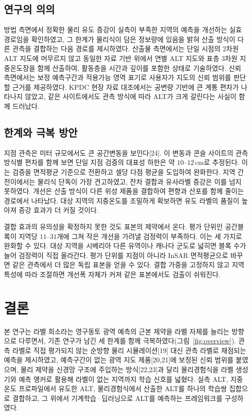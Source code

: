 \documentclass[10pt,twocolumn]{article}
\begin{document}
\subsection{연구의 의의}
방법 측면에서 정확한 물리 유도 증강이 실측이 부족한 지역의 예측을 개선하는 실효 경로임을 확인하였고, 그 한계가 물리식이 담은 정보량에 있음을 밝혀 산출 방식이 다른 관측을 결합하는 다음 경로를 제시하였다. 산출물 측면에서는 단일 시점의 2차원 ALT 지도에 머무르지 않고 동일한 자료 기반 위에서 연별 ALT 지도와 표층 3차원 지중온도장을 함께 산출하여, 활동층을 시간과 깊이를 포함한 상태로 기술하였다. 신뢰 측면에서는 보정 예측구간과 적용가능 영역 표기로 사용자가 지도의 신뢰 범위를 판단할 근거를 제공하였다. KPDC 현장 자료 대조에서는 공변량 기반에 큰 계통 편차가 나타나지 않았고, 같은 사이트에서도 관측 방식에 따라 ALT가 크게 갈린다는 사실이 함께 드러났다.

\subsection{한계와 극복 방안}
지점 관측은 미터 규모에서도 큰 공간변동을 보인다[24]. 이 변동과 콘슬 사이트의 관측 방식별 편차를 함께 보면 단일 지점 검증의 대표성 하한은 약 $10\text{--}12\,\mathrm{cm}$로 추정된다. 이는 검증을 면적평균 기준으로 전환하고 셀당 다점 평균을 도입하여 완화한다. 지역 간 전이에서는 물리식 단독이 가장 견고하였고, 잔차 결합과 유사라벨 증강은 이를 넘지 못하였다. 개선은 산출 방식이 다른 위성 제품을 결합하여 편향과 산포를 함께 줄이는 경로에서 나타났다. 대상 지역의 지중온도를 조밀하게 확보하면 유도 라벨의 품질이 높아져 증강 효과가 더 커질 것이다. 

결합 효과의 유의성을 확정하지 못한 것도 표본의 제약에서 온다. 평가 단위인 공간블록이 지역당 $11\text{--}31$개에 그쳐 작은 개선을 가려낼 검정력이 부족하다. 이는 세 가지로 완화할 수 있다. 대상 지역을 시베리아 다른 유역이나 캐나다 군도로 넓히면 블록 수가 늘어 검정력이 직접 올라간다. 평가 단위를 지점이 아니라 InSAR 면적평균으로 바꾸면 같은 관측에서 더 많은 독립 표본을 얻을 수 있다. 결합 가중을 고정하지 않고 지역 특성에 따라 조절하면 개선폭 자체가 커져 같은 표본에서도 검출이 쉬워진다.

\section{결론}
본 연구는 라벨 희소라는 영구동토 광역 예측의 근본 제약을 라벨 자체를 늘리는 방향으로 다루면서, 기존 연구가 남긴 세 한계를 함께 극복하였다(그림~\ref{fig:overview}). 관측 라벨로 직접 평가되지 않는 순방향 물리 시뮬레이션[19] 대신 관측 라벨로 채점되는 예측을 제시하였고, 예측구간이 없는 광역 지도 제품[20,21]에 보정된 신뢰 범위를 붙였으며, 물리 제약을 신경망 구조에 주입하는 방식[22,23]과 달리 물리경험식을 라벨 생성기와 예측 앵커로 활용해 라벨이 없는 지역까지 학습 신호를 넓혔다. 실측 ALT, 지중온도 프로파일에서 유도한 ALT, 물리경험식에서 산출한 ALT를 하나의 학습쌍 집합으로 결합하고, 그 위에서 기계학습·딥러닝으로 ALT를 예측하는 프레임워크를 구성하였다.
\end{document}

